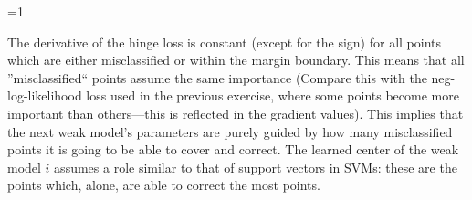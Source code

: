 \ifnum\value{solutions}=1
\begin{solution}

  The derivative of the hinge loss is constant (except for the sign) for all
  points which are either misclassified or within the margin boundary.  This
  means that all ''misclassified`` points assume the same importance (Compare
  this with the neg-log-likelihood loss used in the previous exercise, where
  some points become more important than others---this is reflected in the
  gradient values).  This implies that the next weak model's parameters are
  purely guided by how many misclassified points it is going to be able to
  cover and correct.  The learned center of the weak model $i$ assumes a role
  similar to that of support vectors in SVMs:  these are the points which,
  alone, are able to correct the most points.

\end{solution}
\fi


\exerfoot
